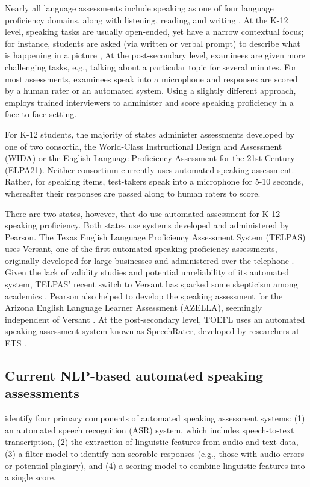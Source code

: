 \documentclass [PhD] {uclathes}
\begin{document}
Nearly all language assessments include speaking as one of four language proficiency domains, along with listening, reading, and writing \citep{ccsso2012framework}. At the K-12 level, speaking tasks are usually open-ended, yet have a narrow contextual focus; for instance, students are asked (via written or verbal prompt) to describe what is happening in a picture \citep{luoma2004assessing}, At the post-secondary level, examinees are given more challenging tasks, e.g., talking about a particular topic for several minutes. For most assessments, examinees speak into a microphone and responses are scored by a human rater or an automated system. Using a slightly different approach, \citet{ielts2023} employs trained interviewers to administer and score speaking proficiency in a face-to-face setting.

For K-12 students, the majority of states administer assessments developed by one of two consortia, the World-Class Instructional Design and Assessment (WIDA) or the English Language Proficiency Assessment for the 21st Century (ELPA21). Neither consortium currently uses automated speaking assessment. Rather, for speaking items, test-takers speak into a microphone for 5-10 seconds, whereafter their responses are passed along to human raters to score.

There are two states, however, that do use automated assessment for K-12 speaking proficiency. Both states use systems developed and administered by Pearson. The Texas English Language Proficiency Assessment System (TELPAS) uses Versant, one of the first automated speaking proficiency assessments, originally developed for large businesses and administered over the telephone \citep{pearson2019versant}. Given the lack of validity studies and potential unreliability of its automated system, TELPAS’ recent switch to Versant has sparked some skepticism among academics \citep{collier2020test}. Pearson also helped to develop the speaking assessment for the Arizona English Language Learner Assessment (AZELLA), seemingly independent of Versant \citep{johnston2019using}. At the post-secondary level, TOEFL uses an automated speaking assessment system known as SpeechRater, developed by researchers at ETS \citep{chen2018automated}.

\subsection{Current NLP-based automated speaking assessments}

\citet{chen2018automated} identify four primary components of automated speaking assessment systems: (1) an automated speech recognition (ASR) system, which includes speech-to-text transcription, (2) the extraction of linguistic features from audio and text data, (3) a filter model to identify non-scorable responses (e.g., those with audio errors or potential plagiary), and (4) a scoring model to combine linguistic features into a single score.
\end{document}
